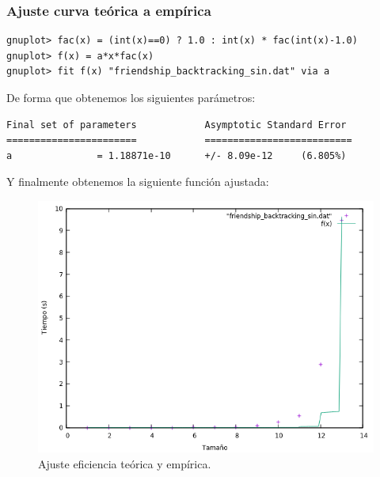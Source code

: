 \subsubsection{Ajuste curva teórica a empírica}

\begin{shaded*}
\begin{verbatim}
gnuplot> fac(x) = (int(x)==0) ? 1.0 : int(x) * fac(int(x)-1.0)
gnuplot> f(x) = a*x*fac(x)
gnuplot> fit f(x) "friendship_backtracking_sin.dat" via a
\end{verbatim}
\end{shaded*}

De forma que obtenemos los siguientes parámetros:

\begin{shaded*}
\begin{verbatim}
Final set of parameters            Asymptotic Standard Error
=======================            ==========================
a               = 1.18871e-10      +/- 8.09e-12     (6.805%)

\end{verbatim}
\end{shaded*}

Y finalmente obtenemos la siguiente función ajustada:
\begin{figure}[H]
    \begin{center}
        \includegraphics[scale=0.7]{imagenes/btsadj.png}
        \caption{Ajuste eficiencia teórica y empírica.}
        \label{fig20}
    \end{center}
\end{figure}



